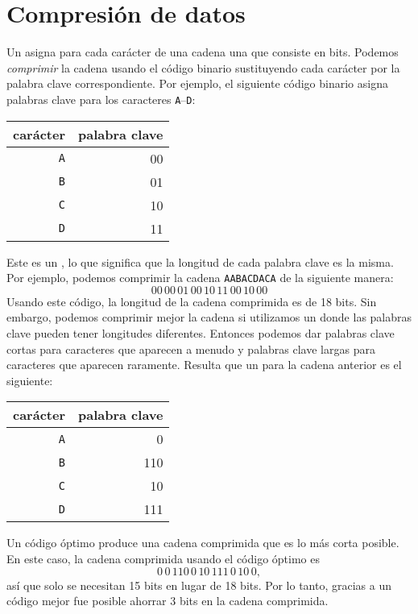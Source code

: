 \section{Compresión de datos}


Un  asigna para cada carácter
de una cadena una  que consiste en bits.
Podemos \emph{comprimir} la cadena usando el código binario
sustituyendo cada carácter por la
palabra clave correspondiente.
Por ejemplo, el siguiente código binario
asigna palabras clave para los caracteres
\texttt{A}--\texttt{D}:
\begin{center}
    \begin{tabular}{rr}
        carácter   & palabra clave \\
        \hline
        \texttt{A} & 00            \\
        \texttt{B} & 01            \\
        \texttt{C} & 10            \\
        \texttt{D} & 11            \\
    \end{tabular}
\end{center}
Este es un ,
lo que significa que la longitud de cada
palabra clave es la misma.
Por ejemplo, podemos comprimir la cadena
\texttt{AABACDACA} de la siguiente manera:
\[00\,00\,01\,00\,10\,11\,00\,10\,00\]
Usando este código, la longitud de la cadena comprimida
es de 18 bits.
Sin embargo, podemos comprimir mejor la cadena
si utilizamos un 
donde las palabras clave pueden tener longitudes diferentes.
Entonces podemos dar palabras clave cortas para
caracteres que aparecen a menudo
y palabras clave largas para caracteres
que aparecen raramente.
Resulta que un 
para la cadena anterior es el siguiente:
\begin{center}
    \begin{tabular}{rr}
        carácter   & palabra clave \\
        \hline
        \texttt{A} & 0             \\
        \texttt{B} & 110           \\
        \texttt{C} & 10            \\
        \texttt{D} & 111           \\
    \end{tabular}
\end{center}
Un código óptimo produce una cadena comprimida
que es lo más corta posible.
En este caso, la cadena comprimida usando
el código óptimo es
\[0\,0\,110\,0\,10\,111\,0\,10\,0,\]
así que solo se necesitan 15 bits en lugar de 18 bits.
Por lo tanto, gracias a un código mejor fue posible
ahorrar 3 bits en la cadena comprimida.

